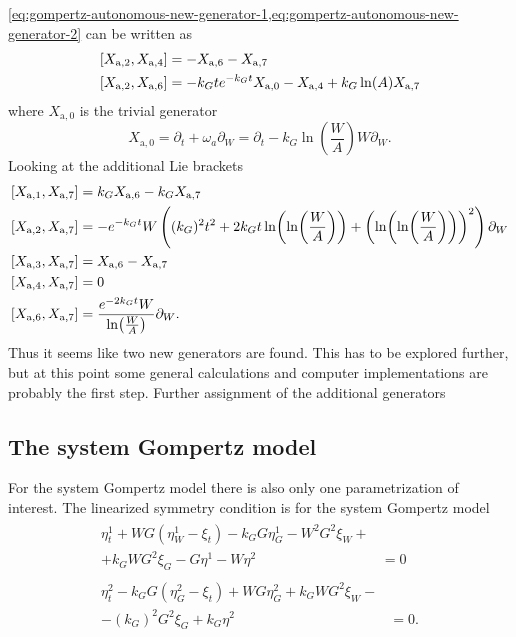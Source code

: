 \cref{eq:gompertz-autonomous-new-generator-1,eq:gompertz-autonomous-new-generator-2} can be written as
\begin{align}
  \comm{X_{\text{a},2}}{X_{\text{a},4}} &= -X_{\text{a},6} - X_{\text{a},7} \\
  \comm{X_{\text{a},2}}{X_{\text{a},6}} &= -k_G t e^{-k_G t} X_{\text{a},0} - X_{\text{a},4} + k_G \ln(A) X_{\text{a},7}
\end{align}
where \(X_{\text{a},0}\) is the trivial generator
\begin{equation}
  X_{\text{a},0} = \partial_t + \omega_a \partial_W = \partial_t - k_G \ln(\frac{W}{A}) W \partial_W.
\end{equation}
Looking at the additional Lie brackets
\begin{align}
  \comm{X_{\text{a},1}}{X_{\text{a},7}} &= k_G X_{\text{a},6} - k_G X_{\text{a},7} \\
  \comm{X_{\text{a},2}}{X_{\text{a},7}} &= - e^{-k_G t} W \left((k_G)^2 t^2 + 2 k_G t \ln(\ln(\frac{W}{A})) + \left(\ln(\ln(\frac{W}{A}))\right)^2 \right) \partial_W \\
  \comm{X_{\text{a},3}}{X_{\text{a},7}} &= X_{\text{a},6} - X_{\text{a},7} \\
  \comm{X_{\text{a},4}}{X_{\text{a},7}} &= 0 \\
  \comm{X_{\text{a},6}}{X_{\text{a},7}} &= \frac{e^{-2 k_G t} W}{\ln(\frac{W}{A})} \partial_W.
\end{align}
Thus it seems like two new generators are found.
This has to be explored further, but at this point some general calculations and computer implementations are probably the first step.
Further assignment of the additional generators



\subsection{The system Gompertz model}

For the system Gompertz model there is also only one parametrization of interest.
The linearized symmetry condition  is for the system Gompertz model
\begin{subequations}\label{eq:gompertz-system-lin-symmetry-cond}
  \begin{align}
    \begin{split}\label{eq:gompertz-system-lin-symmetry-cond-a}
      \eta^1_t + W G \left(\eta^1_W - \xi_t\right) -k_G G \eta^1_G - W^2 G^2 \xi_W +&\\+ k_G W G^2 \xi_G - G \eta^1 - W \eta^2 &= 0 
    \end{split}\\
    \begin{split}\label{eq:gompertz-system-lin-symmetry-cond-b}
      \eta^2_t - k_G G \left(\eta^2_G - \xi_t\right) + W G \eta^2_G + k_G W G^2 \xi_W -&\\- (k_G)^2 G^2 \xi_G + k_G \eta^2 &= 0. 
    \end{split}
  \end{align}
\end{subequations}

